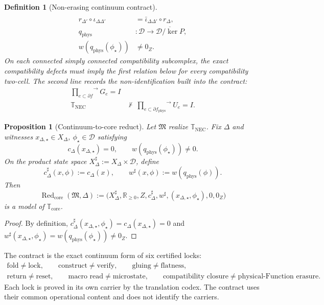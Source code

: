 \documentclass[11pt]{article}
\newtheorem{proposition}[theorem]{Proposition}
\newtheorem{definition}[theorem]{Definition}
\newcommand{\R}{\mathbb R}
\newcommand{\NEC}{\mathbb T_{\mathrm{NEC}}}
\newcommand{\NECore}{\mathbb T_{\mathrm{core}}}
\begin{document}
\begin{definition}[Non-erasing continuum contract]
\begin{align}
\tag{NEC2}\label{eq:nec2}\\
r_{\Delta'}\circ\iota_{\Delta\Delta'}
&=\bar\iota_{\Delta\Delta'}\circ r_\Delta,
\tag{NEC3}\label{eq:nec3}\\
q_{\mathrm{phys}}
&:\mathcal D\to\overline{\mathcal D/\ker P},
\tag{NEC4}\label{eq:nec4}\\
w(q_{\mathrm{phys}}(\phi_\star))&\neq0_Z.
\tag{NEC5}\label{eq:nec5}
\end{align}
On each connected simply connected compatibility subcomplex, the exact compatibility defects must imply the first relation below for every compatibility two-cell. The second line records the non-identification built into the contract:
\begin{align}
\boxed{\overrightarrow{\prod_{e\subset\partial f}}G_e=I}
&\tag{NEC6}\label{eq:nec6}\\
\NEC\ &\not\vdash\
\overrightarrow{\prod_{e\subset\partial f_{\mathrm{phys}}}}U_e=I.
\tag{NEC7}\label{eq:nec7}
\end{align}
\end{definition}

\begin{proposition}[Continuum-to-core reduct]
Let $\mathfrak M$ realize $\NEC$. Fix $\Delta$ and witnesses $x_{\Delta,\star}\in X_\Delta$, $\phi_\star\in\mathcal D$ satisfying
\[
c_\Delta(x_{\Delta,\star})=0,
\qquad
w(q_{\mathrm{phys}}(\phi_\star))\neq0.
\]
On the product state space $X_\Delta^\sharp:=X_\Delta\times\mathcal D$, define
\[
c_\Delta^\sharp(x,\phi):=c_\Delta(x),
\qquad
w^\sharp(x,\phi):=w(q_{\mathrm{phys}}(\phi)).
\]
Then
\[
\operatorname{Red}_{\mathrm{core}}(\mathfrak M,\Delta)
:=
\bigl(X_\Delta^\sharp,\R_{\ge0},Z,c_\Delta^\sharp,w^\sharp,
(x_{\Delta,\star},\phi_\star),0,0_Z\bigr)
\]
is a model of $\NECore$.
\end{proposition}
\begin{proof}
By definition,
$c_\Delta^\sharp(x_{\Delta,\star},\phi_\star)=c_\Delta(x_{\Delta,\star})=0$ and
$w^\sharp(x_{\Delta,\star},\phi_\star)=w(q_{\mathrm{phys}}(\phi_\star))\neq0_Z$.
\end{proof}

The contract is the exact continuum form of six certified locks:
\[
\boxed{
\begin{gathered}
\text{fold}\neq\text{lock},
\qquad
\text{construct}\neq\text{verify},
\qquad
\text{gluing}\neq\text{flatness},\\
\text{return}\neq\text{reset},
\qquad
\text{macro read}\neq\text{microstate},
\qquad
\text{compatibility closure}\neq\text{physical-Function erasure}.
\end{gathered}}
\]
Each lock is proved in its own carrier by the translation codex. The contract uses their common operational content and does not identify the carriers.
\end{document}
